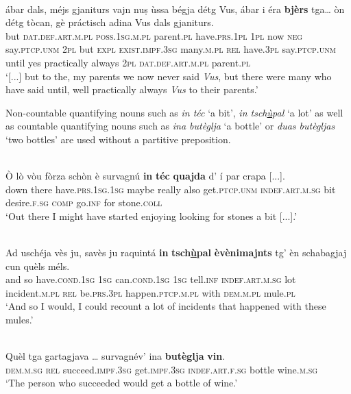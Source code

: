 \ea
\label{}
\\
\gll  [...] ábar dals, méjs gjaniturs vajn nuṣ ùssa bégja détg Vus, ábar i éra \textbf{bjèrs} tga… òn détg tòcan, gè práctisch adina Vus dals gjaniturs.  \\
{} but \textsc{dat.def.art.m.pl} \textsc{poss.1sg.m.pl} parent.\textsc{pl} have.\textsc{prs.1pl} \textsc{1pl} now \textsc{neg} say.\textsc{ptcp.unm} \textsc{2pl} but \textsc{expl} \textsc{exist.impf.3sg}  many.\textsc{m.pl} \textsc{rel} have.\textsc{3pl} say.\textsc{ptcp.unm} until yes practically always \textsc{2pl} \textsc{dat.def.art.m.pl} parent.\textsc{pl}\\
\glt `[...] but to the, my parents we now never said \textit{Vus}, but there were many who have said until, well practically always \textit{Vus} to their parents.'
\z

Non-countable quantifying nouns such as \textit{in téc} `a bit', \textit{in tsch\underline{ù}pal} `a lot' as well as countable quantifying nouns such as \textit{ina butèglja} `a bottle' or \textit{duas butègljas} `two bottles' are used without a partitive preposition.

\ea
\label{}
\\
\gll  Ò lò vòu fòrza schòn è survagnú \textbf{in} \textbf{téc} \textbf{quajda} d' í par crapa [...].\\
down there  have.\textsc{prs.1sg.1sg} maybe really also get.\textsc{ptcp.unm} \textsc{indef.art.m.sg} bit desire.\textsc{f.sg} \textsc{comp} go.\textsc{inf} for stone.\textsc{coll} \\
\glt `Out there I might have started enjoying looking for stones a bit [...].'
\z

\ea
\label{}
\\
\gll  Ad uschéja vès ju, savès ju raquintá \textbf{in} \textbf{tsch\underline{ù}pal} \textbf{èvènimajnts} tg’ èn schabagjaj cun quèls méls.\\
and so have.\textsc{cond.1sg} \textsc{1sg} can.\textsc{cond.1sg} \textsc{1sg} tell.\textsc{inf} \textsc{indef.art.m.sg} lot incident.\textsc{m.pl} \textsc{rel} be.\textsc{prs.3pl} happen.\textsc{ptcp.m.pl} with \textsc{dem.m.pl} mule.\textsc{pl}\\
\glt `And so I would, I could recount a lot of incidents that happened with these mules.'
\z

\ea
\label{}
\\
\gll    Quèl tga gartagjava … survagnév’ ina \textbf{butèglja} \textbf{vin}.\\
\textsc{dem.m.sg} \textsc{rel} succeed.\textsc{impf.3sg} {} get.\textsc{impf.3sg} \textsc{indef.art.f.sg} bottle wine.\textsc{m.sg}\\
\glt `The person who succeeded would get a bottle of wine.'
\z

